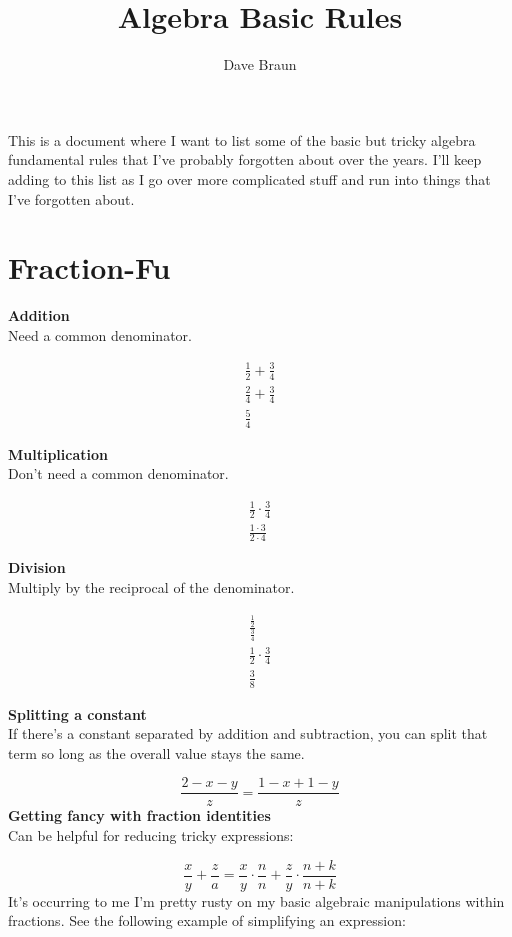 \documentclass{article}
\title{Algebra Basic Rules}
\author{Dave Braun}
\begin{document}
\maketitle

This is a document where I want to list some of the basic but tricky algebra fundamental
rules that I've probably forgotten about over the years. I'll keep adding to this list as
I go over more complicated stuff and run into things that I've forgotten about.

\section{Fraction-Fu}

\textbf{Addition}\\
Need a common denominator.

\begin{align*}
    \frac{1}{2} + \frac{3}{4}\\
    \frac{2}{4} + \frac{3}{4}\\
    \frac{5}{4}
\end{align*}

\textbf{Multiplication}\\
Don't need a common denominator.

\begin{align*}
    \frac{1}{2} \cdot \frac{3}{4}\\
    \frac{1 \cdot 3}{2 \cdot 4}
\end{align*}

\textbf{Division}\\
Multiply by the reciprocal of the denominator.

\begin{align*}
    \frac{\frac{1}{2}}{\frac{3}{4}}\\
    \frac{1}{2} \cdot \frac{3}{4}\\
    \frac{3}{8}
\end{align*}

\textbf{Splitting a constant}\\
If there's a constant separated by addition and subtraction, you can split that term so
long as the overall value stays the same.

$$
\frac{2 - x - y}{z} = \frac{1 - x + 1 - y}{z}
$$
\textbf{Getting fancy with fraction identities}\\
Can be helpful for reducing tricky expressions:

$$
\frac{x}{y} + \frac{z}{a} = \frac{x}{y} \cdot \frac{n}{n} + \frac{z}{y} \cdot
\frac{n+k}{n+k}
$$
It's occurring to me I'm pretty rusty on my basic algebraic manipulations within
fractions. See the following example of simplifying an expression:
\end{document}
